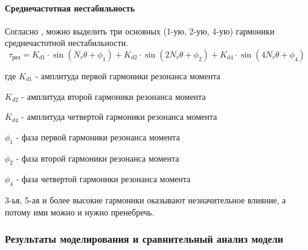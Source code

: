 \paragraph{Среднечастотная нестабильность}
Согласно \cite[ф-ла 5]{Novel_Modeling_and_Damping}, можно выделить три основных (1-ую, 2-ую, 4-ую)
гармоники среднечастотной нестабильности.
\begin{equation}
    \tau_{\text{рез}} =   K_{d1} \cdot \sin{ (  N_{r} \theta + \phi_{1}) }
                         + K_{d2} \cdot \sin{ (2 N_{r} \theta + \phi_{2}) }
                         + K_{d4} \cdot \sin{ (4 N_{r} \theta + \phi_{4}) }
\end{equation}

где $K_{d1}$ - амплитуда первой гармоники резонанса момента

$K_{d2}$ - амплитуда второй гармоники резонанса момента

$K_{d4}$ - амплитуда четвертой гармоники резонанса момента

$\phi_{1}$ - фаза первой гармоники резонанса момента

$\phi_{2}$ - фаза второй гармоники резонанса момента

$\phi_{4}$ - фаза четвертой гармоники резонанса момента

3-ья, 5-ая и более высокие гармоники оказывают незначительное влияние, а потому
ими можно и нужно пренебречь.

\subsubsection{Результаты моделирования и сравнительный анализ модели}
